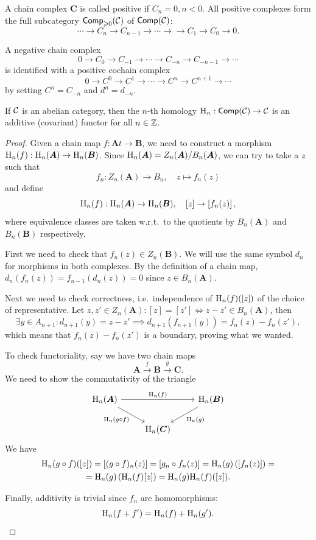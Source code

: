 \begin{defn}
    A chain complex $\bm{C}$ is called positive if $C_n=0,n<0$. All positive complexes form the full subcategory $\mathsf{Comp}_{\geqslant 0} (\mathcal{C})$ of $\mathsf{Comp}(\mathcal{C})$:
    \[\cdots\to C_n\to C_{n-1}\to\cdots\to \to C_1\to C_0\to 0.\]
    
    A negative chain complex
    \[0\to C_0\to C_{-1}\to \cdots \to C_{-n}\to C_{-n-1}\to\cdots\]
    is identified with a positive cochain complex 
    \[0\to C^0\to C^{1}\to \cdots \to C^{n}\to C^{n+1}\to\cdots\]
    by setting $C^n=C_{-n}$ and $d^n=d_{-n}$.
\end{defn}

\begin{prop}
    If $\mathcal{C}$ is an abelian category, then the $n$-th homology $\mathrm{H}_n:\mathsf{Comp}(\mathcal{C})\to \mathcal{C}$ is an additive (covariant) functor for all $n\in \mathbb{Z}$.
\end{prop}
\begin{proof}
    Given a chain map $f:\bm{A}t\to \bm{B}$, we need to construct a morphism $\mathrm{H}_n(f):\mathrm{H}_n(\boldsymbol{A})\to \mathrm{H}_n(\boldsymbol{B})$. Since $\mathrm{H}_n(\boldsymbol{A})=Z_n(\boldsymbol{A})/B_n(\boldsymbol{A})$, we can try to take a $z$ such that
    \[f_n:Z_n(\bm{A})\to B_n,\quad z\mapsto f_n(z)\]
    and define
    \[\mathrm{H}_n(f):\mathrm{H}_n(\boldsymbol{A})\to \mathrm{H}_n(\boldsymbol{B}),\quad [z]\to \left[f_n(z)\right],\]
    where equivalence classes are taken w.r.t.\ to the quotients by $B_n(\bm{A})$ and $B_n(\bm{B})$ respectively.
    
    First we need to check that $f_n(z)\in Z_n(\bm{B})$. We will use the same symbol $d_n$ for morphisms in both complexes. By the definition of a chain map, $d_n(f_n(z))=f_{n-1}(d_n(z))=0$ since $z\in B_n(\bm{A})$.
    
    Next we need to check correctness, i.e.\ independence of $\mathrm{H}_n(f)([z])$ of the choice of representative. Let $z,z'\in Z_n(\bm{A}):[z]=[z']\Leftrightarrow z-z'\in B_n(\bm{A})$, then
    \[\exists y\in A_{n+1}: d_{n+1}(y)=z-z'\implies d_{n+1}(f_{n+1}(y))=f_n(z)-f_n(z'),\]
    which means that $f_n(z)-f_n(z')$ is a boundary, proving what we wanted.
    
    To check functoriality, say we have two chain maps
    \[\bm{A}\overset f\to \bm{B}\overset g\to \bm{C}.\]
    We need to show the commutativity of the triangle
    \[
    \begin{tikzcd}
        \rmH_n(\bm{A}) \arrow[rr,"\rmH_n(f)"]\arrow[dr,swap,"\rmH_n(g\circ f)"]&& \rmH_n(\bm{B})\arrow[dl,"\rmH_n(g)"]\\
        & \rmH_n(\bm{C}) &
    \end{tikzcd}
    \]
    We have 
    \begin{multline}
        \mathrm{H}_n(g\circ f)([z])=\left[(g\circ f)_n(z)\right]=\left[g_n\circ f_n(z)\right]=\mathrm{H}_n(g)\left(\left[f_n(z)\right]\right)=\\=\mathrm{H}_n(g)\left(\mathrm{H}_n(f)[z]\right)=\mathrm{H}_n(g)\mathrm{H}_n(f)([z]).
    \end{multline}
    
    Finally, additivity is trivial since $f_n$ are homomorphisms:
    \[\mathrm{H}_n(f+f')=\mathrm{H}_n(f)+\mathrm{H}_n(g').\]
\end{proof}


